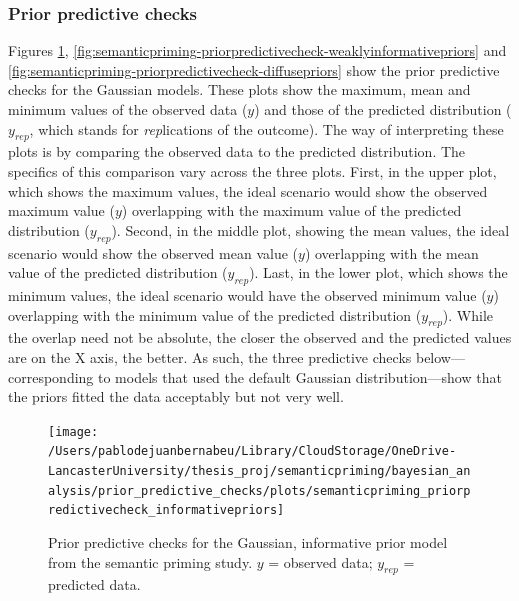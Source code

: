\documentclass[
  12pt,
  man,floatsintext]{apa7}
\begin{document}
\hypertarget{prior-predictive-checks}{%
\subsubsection{Prior predictive checks}\label{prior-predictive-checks}}

Figures \ref{fig:semanticpriming-priorpredictivecheck-informativepriors}, \ref{fig:semanticpriming-priorpredictivecheck-weaklyinformativepriors} and \ref{fig:semanticpriming-priorpredictivecheck-diffusepriors} show the prior predictive checks for the Gaussian models. These plots show the maximum, mean and minimum values of the observed data (\(y\)) and those of the predicted distribution (\(y_{rep}\), which stands for \emph{rep}lications of the outcome). The way of interpreting these plots is by comparing the observed data to the predicted distribution. The specifics of this comparison vary across the three plots. First, in the upper plot, which shows the maximum values, the ideal scenario would show the observed maximum value (\(y\)) overlapping with the maximum value of the predicted distribution (\(y_{rep}\)). Second, in the middle plot, showing the mean values, the ideal scenario would show the observed mean value (\(y\)) overlapping with the mean value of the predicted distribution (\(y_{rep}\)). Last, in the lower plot, which shows the minimum values, the ideal scenario would have the observed minimum value (\(y\)) overlapping with the minimum value of the predicted distribution (\(y_{rep}\)). While the overlap need not be absolute, the closer the observed and the predicted values are on the X axis, the better. As such, the three predictive checks below---corresponding to models that used the default Gaussian distribution---show that the priors fitted the data acceptably but not very well.



\begin{figure}

{\centering \texttt{[image: /Users/pablodejuanbernabeu/Library/CloudStorage/OneDrive-LancasterUniversity/thesis\_proj/semanticpriming/bayesian\_analysis/prior\_predictive\_checks/plots/semanticpriming\_priorpredictivecheck\_informativepriors]} 

}

\caption{Prior predictive checks for the Gaussian, informative prior model from the semantic priming study. \(y\) = observed data; \(y_{rep}\) = predicted data.}\label{fig:semanticpriming-priorpredictivecheck-informativepriors}
\end{figure}
\end{document}
